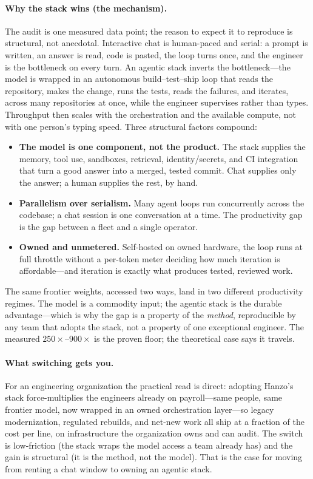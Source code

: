 \documentclass[11pt,letterpaper]{article}
\begin{document}
\paragraph{Why the stack wins (the mechanism).} The audit is one measured data
point; the reason to expect it to reproduce is structural, not anecdotal.
Interactive chat is human-paced and serial: a prompt is written, an answer is read,
code is pasted, the loop turns once, and the engineer is the bottleneck on every
turn. An agentic stack inverts the bottleneck---the model is wrapped in an
autonomous build--test--ship loop that reads the repository, makes the change, runs
the tests, reads the failures, and iterates, across many repositories at once,
while the engineer supervises rather than types. Throughput then scales with the
orchestration and the available compute, not with one person's typing speed.
Three structural factors compound:
\begin{itemize}
  \item \textbf{The model is one component, not the product.} The stack supplies the
  memory, tool use, sandboxes, retrieval, identity/secrets, and CI integration that
  turn a good answer into a merged, tested commit. Chat supplies only the answer; a
  human supplies the rest, by hand.
  \item \textbf{Parallelism over serialism.} Many agent loops run concurrently
  across the codebase; a chat session is one conversation at a time. The
  productivity gap is the gap between a fleet and a single operator.
  \item \textbf{Owned and unmetered.} Self-hosted on owned hardware, the loop runs at
  full throttle without a per-token meter deciding how much iteration is
  affordable---and iteration is exactly what produces tested, reviewed work.
\end{itemize}
The same frontier weights, accessed two ways, land in two different productivity
regimes. The model is a commodity input; the agentic stack is the durable
advantage---which is why the gap is a property of the \emph{method}, reproducible by
any team that adopts the stack, not a property of one exceptional engineer. The
measured $250\times$--$900\times$ is the proven floor; the theoretical case says it
travels.

\paragraph{What switching gets you.} For an engineering organization the practical
read is direct: adopting Hanzo's stack force-multiplies the engineers already on
payroll---same people, same frontier model, now wrapped in an owned orchestration
layer---so legacy modernization, regulated rebuilds, and net-new work all ship at a
fraction of the cost per line, on infrastructure the organization owns and can
audit. The switch is low-friction (the stack wraps the model access a team already
has) and the gain is structural (it is the method, not the model). That is the case
for moving from renting a chat window to owning an agentic stack.
\end{document}
